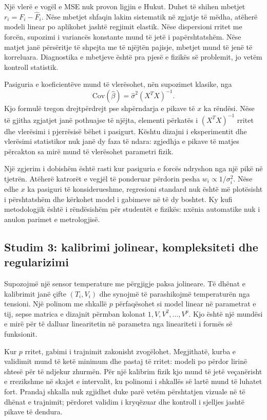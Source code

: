 \documentclass[12pt,a4paper,oneside]{book}
\begin{document}
Një vlerë e vogël e MSE nuk provon ligjin e Hukut. Duhet të shihen mbetjet $r_i=F_i-\hat F_i$. Nëse mbetjet shfaqin lakim sistematik në zgjatje të mëdha, atëherë modeli linear po aplikohet jashtë regjimit elastik. Nëse dispersioni rritet me forcën, supozimi i variancës konstante mund të jetë i papërshtatshëm. Nëse matjet janë përsëritje të shpejta me të njëjtën pajisje, mbetjet mund të jenë të korreluara. Diagnostika e mbetjeve është pra pjesë e fizikës së problemit, jo vetëm kontroll statistik.

Pasiguria e koeficientëve mund të vlerësohet, nën supozimet klasike, nga
\[
\mathrm{Cov}(\hat\beta)=\hat\sigma^2(X^TX)^{-1}.
\]
Kjo formulë tregon drejtpërdrejt pse shpërndarja e pikave të $x$ ka rëndësi. Nëse të gjitha zgjatjet janë pothuajse të njëjta, elementi përkatës i $(X^TX)^{-1}$ rritet dhe vlerësimi i pjerrësisë bëhet i pasigurt. Kështu dizajni i eksperimentit dhe vlerësimi statistikor nuk janë dy faza të ndara: zgjedhja e pikave të matjes përcakton sa mirë mund të vlerësohet parametri fizik.

Një zgjerim i dobishëm është rasti kur pasiguria e forcës ndryshon nga një pikë në tjetrën. Atëherë katrorët e vegjël të ponderuar përdorin pesha $w_i\propto1/\sigma_i^2$. Nëse edhe $x$ ka pasiguri të konsiderueshme, regresioni standard nuk është më plotësisht i përshtatshëm dhe kërkohet model i gabimeve në të dy boshtet. Ky kufi metodologjik është i rëndësishëm për studentët e fizikës: nxënia automatike nuk i anulon parimet e metrologjisë.

\subsection*{Studim 3: kalibrimi jolinear, kompleksiteti dhe regularizimi}
Supozojmë një sensor temperature me përgjigje paksa jolineare. Të dhënat e kalibrimit janë çifte $(T_i,V_i)$ dhe synojmë të parashikojmë temperaturën nga tensioni. Një polinom me shkallë $p$ përfaqësohet si model linear në parametrat e tij, sepse matrica e dizajnit përmban kolonat $1,V,V^2,\ldots,V^p$. Kjo është një mundësi e mirë për të dalluar linearitetin në parametra nga lineariteti i formës së funksionit.

Kur $p$ rritet, gabimi i trajnimit zakonisht zvogëlohet. Megjithatë, kurba e validimit mund të ketë minimum dhe pastaj të rritet: modeli po përdor lirinë shtesë për të ndjekur zhurmën. Për një kalibrim fizik kjo mund të jetë veçanërisht e rrezikshme në skajet e intervalit, ku polinomi i shkallës së lartë mund të luhatet fort. Prandaj shkalla nuk zgjidhet duke parë vetëm përshtatjen vizuale në të dhënat e trajnimit; përdoret validim i kryqëzuar dhe kontroll i sjelljes jashtë pikave të dendura.
\end{document}
